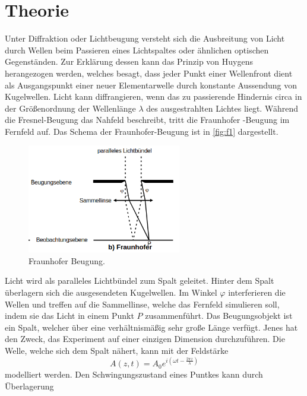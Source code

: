 \section{Theorie}
\label{sec:Theorie}

Unter Diffraktion oder Lichtbeugung versteht sich die Ausbreitung von Licht 
durch Wellen beim Passieren eines Lichtspaltes oder ähnlichen optischen 
Gegenständen. Zur Erklärung dessen kann das Prinzip von Huygens herangezogen 
werden, welches besagt, dass jeder Punkt einer Wellenfront dient als 
Ausgangspunkt einer neuer Elementarwelle durch konstante Aussendung von 
Kugelwellen. Licht kann diffrangieren, wenn das zu passierende Hindernis circa 
in der Größenordnung der Wellenlänge $\lambda$ des ausgestrahlten Lichtes 
liegt. Während die Fresnel-Beugung das Nahfeld beschreibt, tritt die Fraunhofer
-Beugung im Fernfeld auf. Das Schema der Fraunhofer-Beugung ist in
\autoref{fig:f1} dargestellt.
\begin{figure}[H]
    \centering
        \centering
        \includegraphics[width=0.6\textwidth]{Bilder/Fraunhoferschema.png}
        \caption{Fraunhofer Beugung. \cite{anleitung3}}
    \hfill
    \label{fig:f1}
\end{figure}
\noindent Licht wird als paralleles Lichtbündel zum Spalt geleitet. Hinter dem
Spalt überlagern sich die ausgesendeten Kugelwellen. Im Winkel $\varphi$ interferieren 
die Wellen und treffen auf die Sammellinse, welche das Fernfeld simulieren soll,
indem sie das Licht in einem Punkt $P$ zusammenführt.
\noindent Das Beugungsobjekt ist ein Spalt, welcher über eine verhältnismäßig
sehr große Länge verfügt. Jenes hat den Zweck, das Experiment auf einer einzigen 
Dimension durchzuführen. Die Welle, welche sich dem Spalt nähert, kann mit 
der Feldstärke
\begin{equation}
    \label{eqn:1}
    A(z,t) = A_0 e^{i\left(\omega t - \frac{2 \pi z}{\lambda}\right)}
\end{equation}
modelliert werden. Den Schwingungszustand eines Puntkes kann durch Überlagerung 
